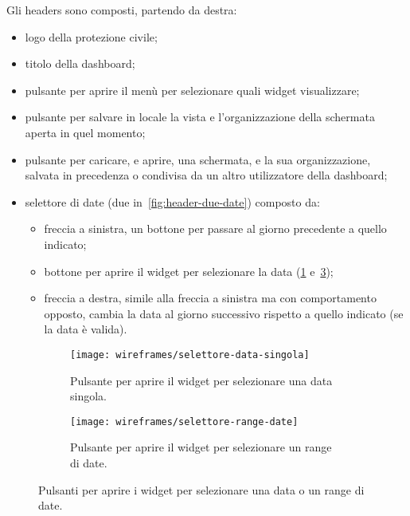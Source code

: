 Gli headers sono composti, partendo da destra:
\begin{itemize}
    \item logo della protezione civile;
    \item titolo della dashboard;
    \item pulsante per aprire il menù per selezionare quali widget visualizzare;
    \item pulsante per salvare in locale la vista e l'organizzazione della schermata aperta in quel momento;
    \item pulsante per caricare, e aprire, una schermata, e la sua organizzazione, salvata in precedenza o condivisa da un altro utilizzatore della dashboard;
    \item selettore di date (due in~\ref{fig:header-due-date}) composto da:
        \begin{itemize}
            \item freccia a sinistra, un bottone per passare al giorno precedente a quello indicato;
            \item bottone per aprire il widget per selezionare la data (\ref{fig:selettore-data-singola} e~\ref{fig:selettore-range-date});
            \item freccia a destra, simile alla freccia a sinistra ma con comportamento opposto, cambia la data al giorno successivo rispetto a quello indicato (se la data è valida).
        \end{itemize}
\end{itemize}

\begin{figure}[H]
    \begin{subfigure}[b]{0.5\textwidth}
        \centering
        \texttt{[image: wireframes/selettore-data-singola]}
        \caption{Pulsante per aprire il widget per selezionare una data singola.}\label{fig:selettore-data-singola}
    \end{subfigure}
\hfill
    \begin{subfigure}[b]{0.5\textwidth}
        \centering
        \texttt{[image: wireframes/selettore-range-date]}
        \caption{Pulsante per aprire il widget per selezionare un range di date.}\label{fig:selettore-range-date}
    \end{subfigure}
    \caption{Pulsanti per aprire i widget per selezionare una data o un range di date.}
\end{figure}

